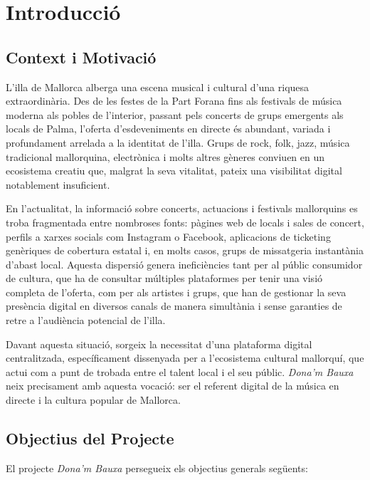 \chapter{Introducció}
\label{chapter:introduction}

\section{Context i Motivació}

L'illa de Mallorca alberga una escena musical i cultural d'una riquesa extraordinària. Des de les festes de la Part Forana fins als festivals de música moderna als pobles de l'interior, passant pels concerts de grups emergents als locals de Palma, l'oferta d'esdeveniments en directe és abundant, variada i profundament arrelada a la identitat de l'illa. Grups de rock, folk, jazz, música tradicional mallorquina, electrònica i molts altres gèneres conviuen en un ecosistema creatiu que, malgrat la seva vitalitat, pateix una visibilitat digital notablement insuficient.

En l'actualitat, la informació sobre concerts, actuacions i festivals mallorquins es troba fragmentada entre nombroses fonts: pàgines web de locals i sales de concert, perfils a xarxes socials com Instagram o Facebook, aplicacions de ticketing genèriques de cobertura estatal i, en molts casos, grups de missatgeria instantània d'abast local. Aquesta dispersió genera ineficiències tant per al públic consumidor de cultura, que ha de consultar múltiples plataformes per tenir una visió completa de l'oferta, com per als artistes i grups, que han de gestionar la seva presència digital en diversos canals de manera simultània i sense garanties de retre a l'audiència potencial de l'illa.

Davant aquesta situació, sorgeix la necessitat d'una plataforma digital centralitzada, específicament dissenyada per a l'ecosistema cultural mallorquí, que actui com a punt de trobada entre el talent local i el seu públic. \textit{Dona'm Bauxa} neix precisament amb aquesta vocació: ser el referent digital de la música en directe i la cultura popular de Mallorca.

\section{Objectius del Projecte}

El projecte \textit{Dona'm Bauxa} persegueix els objectius generals següents:

